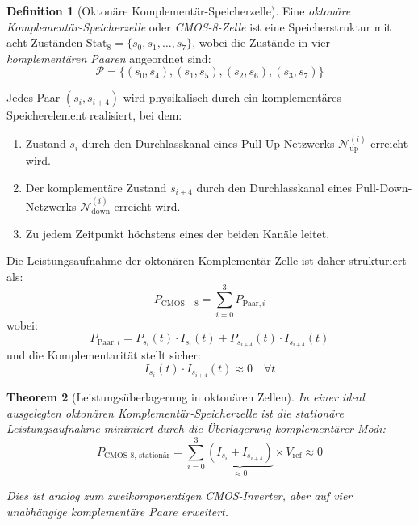 \documentclass[12pt, a4paper]{article}
\newtheorem{theorem}{Theorem}[section]
\theoremstyle{definition}
\newtheorem{definition}[theorem]{Definition}
\theoremstyle{remark}
\newcommand{\Stat}{\mathrm{Stat}}
\begin{document}
\begin{definition}[Oktonäre Komplementär-Speicherzelle]
\label{def:oktonaere_cmos_zelle}
Eine \emph{oktonäre Komplementär-Speicherzelle} oder \emph{CMOS-8-Zelle} ist eine Speicherstruktur mit acht Zuständen $\Stat_8 = \{s_0, s_1, \ldots, s_7\}$, wobei die Zustände in vier \textit{komplementären Paaren} angeordnet sind:
\[
\mathcal{P} = \{(s_0, s_4), (s_1, s_5), (s_2, s_6), (s_3, s_7)\}
\]

Jedes Paar $(s_i, s_{i+4})$ wird physikalisch durch ein komplementäres Speicherelement realisiert, bei dem:
\begin{enumerate}[label=(\roman*)]
  \item Zustand $s_i$ durch den Durchlasskanal eines Pull-Up-Netzwerks $\mathcal{N}_{\mathrm{up}}^{(i)}$ erreicht wird.
  \item Der komplementäre Zustand $s_{i+4}$ durch den Durchlasskanal eines Pull-Down-Netzwerks $\mathcal{N}_{\mathrm{down}}^{(i)}$ erreicht wird.
  \item Zu jedem Zeitpunkt höchstens eines der beiden Kanäle leitet.
\end{enumerate}
\end{definition}

Die Leistungsaufnahme der oktonären Komplementär-Zelle ist daher strukturiert als:
\[
P_{\mathrm{CMOS-8}} = \sum_{i=0}^{3} P_{\mathrm{Paar},i}
\]
wobei:
\[
P_{\mathrm{Paar},i} = P_{s_i}(t) \cdot I_{s_i}(t) + P_{s_{i+4}}(t) \cdot I_{s_{i+4}}(t)
\]
und die Komplementarität stellt sicher:
\[
I_{s_i}(t) \cdot I_{s_{i+4}}(t) \approx 0 \quad \forall t
\]

\begin{theorem}[Leistungsüberlagerung in oktonären Zellen]
\label{thm:oktonaere_leistungsueberlagering}
In einer ideal ausgelegten oktonären Komplementär-Speicherzelle ist die stationäre Leistungsaufnahme minimiert durch die Überlagerung komplementärer Modi:
\[
P_{\text{CMOS-8, stationär}} = \sum_{i=0}^{3} \underbrace{(I_{s_i} + I_{s_{i+4}})}_{\approx 0} \times V_{\text{ref}} \approx 0
\]

Dies ist analog zum zweikomponentigen CMOS-Inverter, aber auf vier unabhängige komplementäre Paare erweitert.
\end{theorem}
\end{document}
